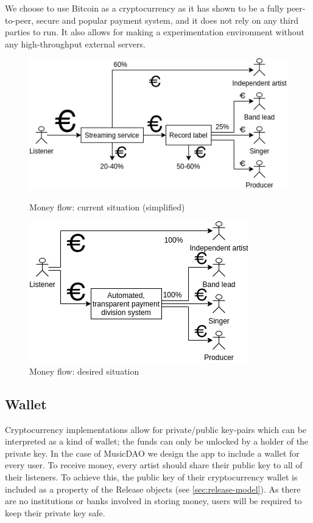 We choose to use Bitcoin as a cryptocurrency as it has shown to be a fully peer-to-peer, secure and popular payment system, and it does not rely on any third parties to run. It also allows for making a experimentation environment without any high-throughput external servers. 

\begin{figure}
        \includegraphics[width=\linewidth]{design/current-money-flow.png}
        \caption{Money flow: current situation (simplified)}
        \label{fig:current-money-flow}
    \endminipage\hfill
        \includegraphics[width=\linewidth]{design/desired-money-flow.png}
        \caption{Money flow: desired situation}
        \label{fig:desired-money-flow}
    \endminipage
\end{figure}
\subsection{Wallet}
Cryptocurrency implementations allow for private/public key-pairs which can be interpreted as a kind of wallet; the funds can only be unlocked by a holder of the private key. In the case of MusicDAO we design the app to include a wallet for every user. To receive money, every artist should share their public key to all of their listeners. To achieve this, the public key of their cryptocurrency wallet is included as a property of the Release objects (see \ref{sec:release-model}). As there are no institutions or banks involved in storing money, users will be required to keep their private key safe.

